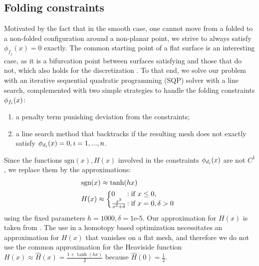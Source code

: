 \subsection{Folding constraints}
Motivated by the fact that in the smooth case, one cannot move from a folded to a non-folded configuration around a non-planar point, we strive to always satisfy $\phi_{f_j}(x) = 0$ exactly. The common starting point of a flat surface is an interesting case, as it is a bifurcation point between surfaces satisfying  and those that do not, which also holds for the discretization . To that end, we solve our problem with an iterative sequential quadratic programming (SQP) solver with a line search, complemented with two simple strategies to handle the folding constraints $\phi_{f_i}(x)$:
\begin{enumerate}
	\item a penalty term \cite{nocedal} punishing  deviation from the constraints; \label{opt:penalty}
	\item a line search method that backtracks if the resulting mesh does not exactly satisfy $\phi_{d_i}(x) = 0, i = 1,...,n$.
\end{enumerate}
Since the functions $\text{sgn}(x),H(x)$ involved in the constraints $\phi_{d_i}(x)$ are not $C^1$, we replace them by the approximations:
%
\begin{align} 
\begin{split}\label{eq:const_inner}
&\text{sgn}(x) \approx \tanh(hx) \\
&H(x) \approx  \left\{\begin{array}{@{}l@{\thinspace}l}
0  &: \text{if } x \leq 0, \\
\frac{x^2}{x^2+\delta} &: \text{if } x = 0, \delta > 0 \\
\end{array}\right.
\end{split}
\end{align}
using the fixed parameters $h=1000,\delta = \text{1e-5}$. Our approximation for $H(x)$ is taken from \cite{l0_approximation,autocuts}.  The use in a homotopy based optimization necessitates an approximation for $H(x)$ that vanishes on a flat mesh, and therefore we do not use the common approximation for the Heaviside function $H(x) \approx \hat{H}(x) =  \frac{1+\tanh(hx)}{2}$ because $\hat H(0) = \frac{1}{2}$.

